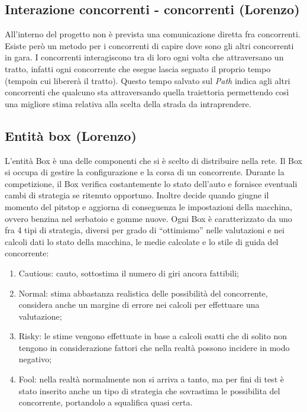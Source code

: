 \subsection{Interazione concorrenti - concorrenti (Lorenzo)}
All'interno del progetto non è prevista una comunicazione diretta fra
concorrenti. Esiste però un metodo per i concorrenti di capire dove sono gli
altri concorrenti in gara. I concorrenti interagiscono tra di loro ogni volta
che attraversano un tratto, infatti ogni concorrente che esegue lascia segnato
il proprio tempo (tempoin cui libererà il tratto). Questo tempo salvato sul
\emph{Path} indica agli altri concorrenti che qualcuno sta attraversando quella
traiettoria permettendo così una migliore stima relativa alla scelta della
strada da intraprendere.
\subsection{Entità box (Lorenzo)}
L'entità Box è una delle componenti che si è scelto di distribuire nella rete.
Il Box si occupa di gestire la configurazione e la corsa di un concorrente.
Durante la competizione, il Box verifica costantemente lo stato dell'auto e
fornisce eventuali cambi di strategia se ritenuto opportuno. Inoltre decide
quando giugne il momento del pitstop e aggiorna di conseguenza le impostazioni
della macchina, ovvero benzina nel serbatoio e gomme nuove. Ogni Box è
caratterizzato da uno fra 4 tipi di strategia, diversi per grado di
``ottimismo'' nelle valutazioni e nei calcoli dati lo stato della macchina, le
medie calcolate e lo stile di guida del concorrente:
\begin{enumerate}
\item Cautious: cauto, sottostima il numero di giri ancora fattibili;
\item Normal: stima abbastanza realistica delle possibilità del concorrente,
considera anche un margine di errore nei calcoli per effettuare una valutazione;
\item Risky: le stime vengono effettuate in base a calcoli esatti che di solito
non tengono in considerazione fattori che nella realtà possono incidere in modo
negativo;
\item Fool: nella realtà normalmente non si arriva a tanto, ma per fini di test
è stato inserito anche un tipo di strategia che sovrastima le possibilita del
concorrente, portandolo a squalifica quasi certa.
\end{enumerate}
